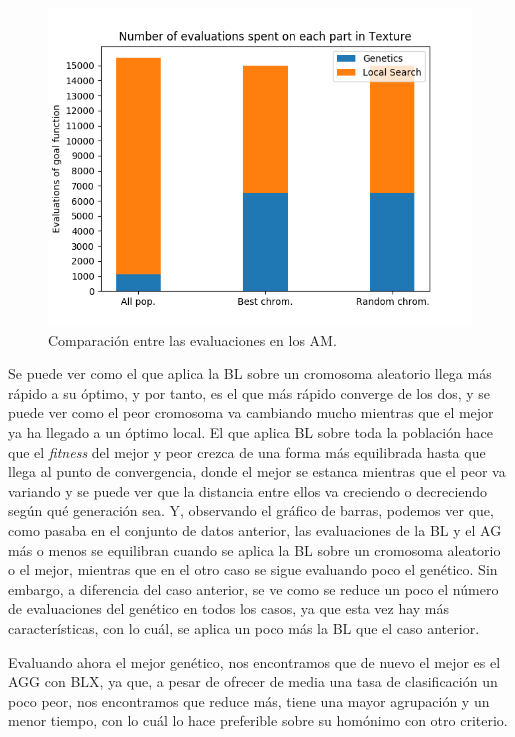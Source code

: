 \documentclass[11pt,a4paper]{article}
\begin{document}
\begin{figure}[H]
\centering
\includegraphics[scale=0.6]{img/bars-texture.png}
\caption{Comparación entre las evaluaciones en los AM.}
\end{figure}

Se puede ver como el que aplica la BL sobre un cromosoma aleatorio llega más rápido a su óptimo, y por tanto, es el que más rápido
converge de los dos, y se puede ver como el peor cromosoma va cambiando mucho mientras que el mejor ya ha llegado a un óptimo
local. El que aplica BL sobre toda la población hace que el \textit{fitness} del mejor y peor crezca de una forma más equilibrada
hasta que llega al punto de convergencia, donde el mejor se estanca mientras que el peor va variando y se puede ver que la
distancia entre ellos va creciendo o decreciendo según qué generación sea. Y, observando el gráfico de barras, podemos ver que,
como pasaba en el conjunto de datos anterior, las evaluaciones de la BL y el AG más o menos se equilibran cuando se aplica la BL
sobre un cromosoma aleatorio o el mejor, mientras que en el otro caso se sigue evaluando poco el genético. Sin embargo, a
diferencia del caso anterior, se ve como se reduce un poco el número de evaluaciones del genético en todos los casos, ya que
esta vez hay más características, con lo cuál, se aplica un poco más la BL que el caso anterior.

Evaluando ahora el mejor genético, nos encontramos que de nuevo el mejor es el AGG con BLX, ya que, a pesar de ofrecer de media
una tasa de clasificación un poco peor, nos encontramos que reduce más, tiene una mayor agrupación y un menor tiempo, con lo
cuál lo hace preferible sobre su homónimo con otro criterio.
\end{document}

